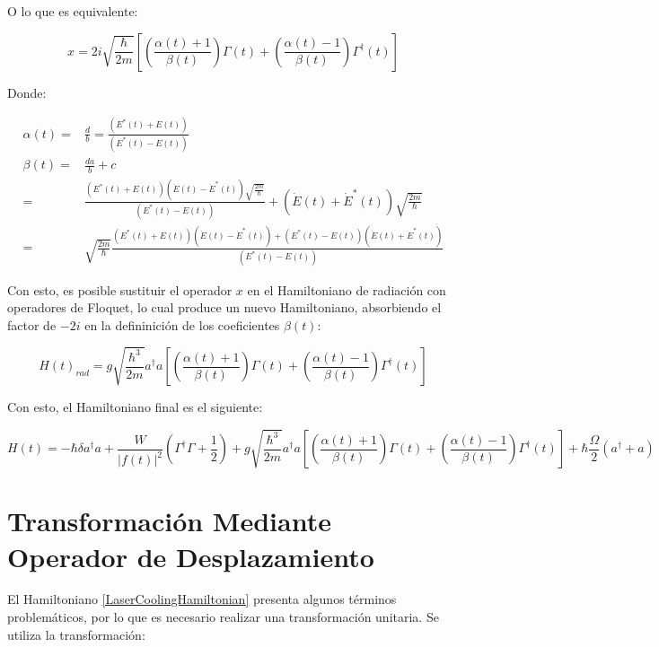 \documentclass[a4paper,10pt]{report}
\begin{document}
O lo que es equivalente:

\begin{equation}
x = 2i \sqrt{\frac{\hbar}{2m}}[(\frac{\alpha (t) +1}{\beta(t)})\Gamma (t) +(\frac{\alpha (t) -1}{\beta(t)})\Gamma^\dagger (t)]
\end{equation}

Donde:

\begin{align}
\alpha(t) =& \frac{d}{b} = \frac{(E^* (t) + E (t))}{(E^* (t) - E (t))} \\
\beta(t) = & \frac{da}{b}+c \\
=& \frac{(E^* (t) + E (t))(\dot{E} (t) - \dot{E}^* (t)) \sqrt{\frac{2m}{\hbar}}}{(E^* (t) - E (t))} + (\dot{E} (t) + \dot{E}^* (t)) \sqrt{\frac{2m}{\hbar}}\\
=&\sqrt{\frac{2m}{\hbar}}\frac{(E^* (t) + E (t))(\dot{E} (t) - \dot{E}^* (t))+(E^* (t) - E (t))(\dot{E} (t) + \dot{E}^* (t))}{(E^* (t) - E (t))}
\end{align}

Con esto, es posible sustituir el operador $x$ en el Hamiltoniano de radiación con operadores de Floquet, lo cual produce un nuevo Hamiltoniano, absorbiendo el factor de $-2i$ en la defininición de los coeficientes $\beta(t)$:

\begin{equation}
H(t)_{rad} = g \sqrt{\frac{\hbar^3}{2m}}  a^\dagger a[(\frac{\alpha (t) +1}{\beta(t)})\Gamma (t) +(\frac{\alpha (t) -1}{\beta(t)})\Gamma^\dagger (t)]
\end{equation}

Con esto, el Hamiltoniano final es el siguiente:

\begin{equation}\label{LaserCoolingHamiltonian}
H(t) = -\hbar \delta a^\dagger a + \frac{W}{|f(t)|^2}(\Gamma^\dagger \Gamma + \frac{1}{2}) +  g \sqrt{\frac{\hbar^3}{2m}}  a^\dagger a[(\frac{\alpha (t) +1}{\beta(t)})\Gamma (t) +(\frac{\alpha (t) -1}{\beta(t)})\Gamma^\dagger (t)] + \hbar\frac{\Omega}{2}(a^\dagger + a)
\end{equation}

\section{Transformación Mediante Operador de Desplazamiento}

El Hamiltoniano \ref{LaserCoolingHamiltonian} presenta algunos términos problemáticos, por lo que es necesario realizar una transformación unitaria. Se utiliza la transformación:
\end{document}
